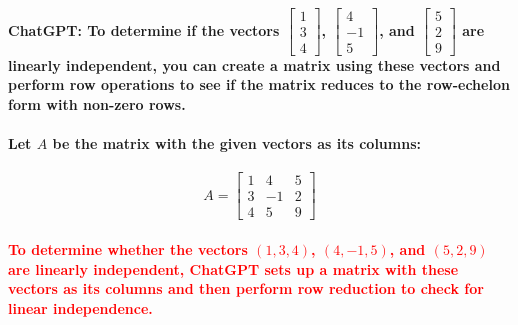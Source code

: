 \documentclass[11pt]{article} %
\begin{document}
\begin{mdframed}[
        backgroundcolor=white,  %
        linecolor=black,        %
        leftmargin=5pt,         %
        rightmargin=5pt,        %
        linewidth=2pt           %
    ]
    \paragraph{\textbf{ChatGPT}: To determine if the vectors \( \begin{bmatrix} 1 \\ 3 \\ 4 \end{bmatrix} \), \( \begin{bmatrix} 4 \\ -1 \\ 5 \end{bmatrix} \), and \( \begin{bmatrix} 5 \\ 2 \\ 9 \end{bmatrix} \) are linearly independent, you can create a matrix using these vectors and perform row operations to see if the matrix reduces to the row-echelon form with non-zero rows.}
    \paragraph{Let \( A \) be the matrix with the given vectors as its columns:}
    \[ A = \begin{bmatrix} 1 & 4 & 5 \\ 3 & -1 & 2 \\ 4 & 5 & 9 \end{bmatrix} \]
    \paragraph{\textcolor{red}{To determine whether the vectors $(1, 3, 4)$, $(4, -1, 5)$, and $(5, 2, 9)$ are linearly independent, ChatGPT sets up a matrix with these vectors as its columns and then perform row reduction to check for linear independence.}}

\end{mdframed}
\end{document}
